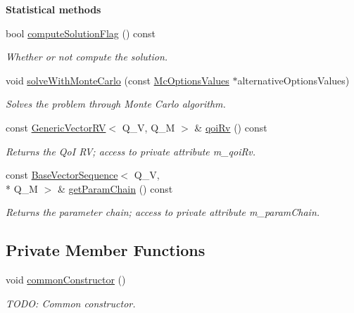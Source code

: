 \begin{Indent}{\bf Statistical methods}\par
\begin{DoxyCompactItemize}
\item 
bool \hyperlink{class_q_u_e_s_o_1_1_statistical_forward_problem_a2c67e3878a0bddf2bf28db9f04962456}{compute\-Solution\-Flag} () const 
\begin{DoxyCompactList}\small\item\em Whether or not compute the solution. \end{DoxyCompactList}\item 
void \hyperlink{class_q_u_e_s_o_1_1_statistical_forward_problem_a523a6e2ac16dd949849bb7b46d98b842}{solve\-With\-Monte\-Carlo} (const \hyperlink{class_q_u_e_s_o_1_1_mc_options_values}{Mc\-Options\-Values} $\ast$alternative\-Options\-Values)
\begin{DoxyCompactList}\small\item\em Solves the problem through Monte Carlo algorithm. \end{DoxyCompactList}\item 
const \hyperlink{class_q_u_e_s_o_1_1_generic_vector_r_v}{Generic\-Vector\-R\-V}$<$ Q\-\_\-\-V, Q\-\_\-\-M $>$ \& \hyperlink{class_q_u_e_s_o_1_1_statistical_forward_problem_ae2aa8a443bec68b57342c3afc079356d}{qoi\-Rv} () const 
\begin{DoxyCompactList}\small\item\em Returns the Qo\-I R\-V; access to private attribute m\-\_\-qoi\-Rv. \end{DoxyCompactList}\item 
const \hyperlink{class_q_u_e_s_o_1_1_base_vector_sequence}{Base\-Vector\-Sequence}$<$ Q\-\_\-\-V, \\*
Q\-\_\-\-M $>$ \& \hyperlink{class_q_u_e_s_o_1_1_statistical_forward_problem_abedc9de0cb7724c9ae37f447a5da4dec}{get\-Param\-Chain} () const 
\begin{DoxyCompactList}\small\item\em Returns the parameter chain; access to private attribute m\-\_\-param\-Chain. \end{DoxyCompactList}\end{DoxyCompactItemize}
\end{Indent}
\subsection*{Private Member Functions}
\begin{DoxyCompactItemize}
\item 
void \hyperlink{class_q_u_e_s_o_1_1_statistical_forward_problem_af39a259d0c779d3e9bf33fbf0ef013c3}{common\-Constructor} ()
\begin{DoxyCompactList}\small\item\em T\-O\-D\-O\-: Common constructor. \end{DoxyCompactList}\end{DoxyCompactItemize}
